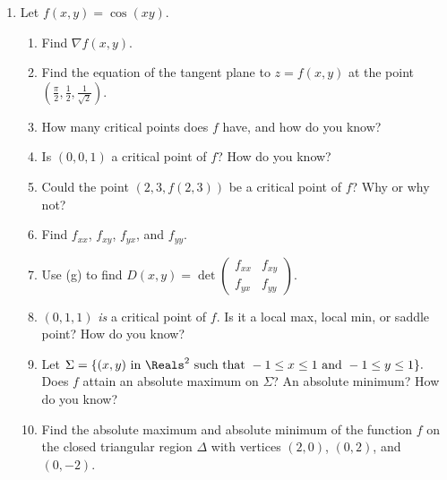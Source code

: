 \documentclass[12 pt]{article}
\begin{document}
\begin{enumerate}[leftmargin=0in, rightmargin=-0.25in]
	\item Let $f(x,y)=\cos(x y)$.
	\begin{enumerate}[itemsep=0.55in]
		\item Find $\nabla f(x,y)$.
		\item Find the equation of the tangent plane to $z=f(x,y)$ at the point $\left(\frac{\pi}{2},\frac{1}{2},\frac{1}{\sqrt{2}}\right)$.
		\item How many critical points does $f$ have, and how do you know?
		\item Is $(0,0,1)$ a critical point of $f$? How do you know?
		\item Could the point $(2,3,f(2,3))$ be a critical point of $f$? Why or why not?
		\item Find $f_{xx}$, $f_{xy}$, $f_{yx}$, and $f_{yy}$.
		\item Use (g) to find $D(x,y)=\det\left(\begin{array}{cc}f_{xx} & f_{xy} \\[3mm] f_{yx} & f_{yy}\end{array}\right)$.
		\item $(0,1,1)$ \textit{is} a critical point of $f$. Is it a local max, local min, or saddle point? How do you know?
		\item Let $\Sigma=\{(x,y)\text{ in }\Reals^2\text{ such that }-1\leq x\leq 1\text{ and }-1\leq y\leq 1\}.$
		Does $f$ attain an absolute maximum on $\Sigma$? An absolute minimum? How do you know?
		\item Find the absolute maximum and absolute minimum of the function $f$ on the closed triangular region $\Delta$ with vertices $(2,0)$, $(0,2)$, and $(0,-2)$.
	\end{enumerate}
%
%	
%

	


\end{enumerate}
\end{document}
